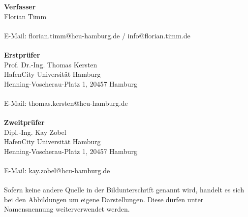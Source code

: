 \documentclass[a4paper,12pt,bibliography=totoc, listof=totoc, titlepage]{scrreprt}
\begin{document}
\vspace{1cm}
\noindent\textbf{\large Verfasser}\\
Florian Timm\\
\\
E-Mail: florian.timm@hcu-hamburg.de / info@florian.timm.de \\
\vspace{2cm}\\
\noindent\textbf{\large Erstprüfer}\\
Prof. Dr.-Ing. Thomas Kersten\\
HafenCity Universität Hamburg\\
Henning-Voscherau-Platz 1, 20457 Hamburg\\
\\
E-Mail: thomas.kersten@hcu-hamburg.de\\
\vspace{2cm}\\
\textbf{\large Zweitprüfer}\\
Dipl.-Ing. Kay Zobel\\
HafenCity Universität Hamburg\\
Henning-Voscherau-Platz 1, 20457 Hamburg\\
\\
E-Mail: kay.zobel@hcu-hamburg.de\\
\vspace{4cm}\\
Sofern keine andere Quelle in der Bildunterschrift genannt wird, handelt es sich bei den Abbildungen um eigene Darstellungen. Diese dürfen unter Namensnennung weiterverwendet werden.
\newpage
\end{document}
